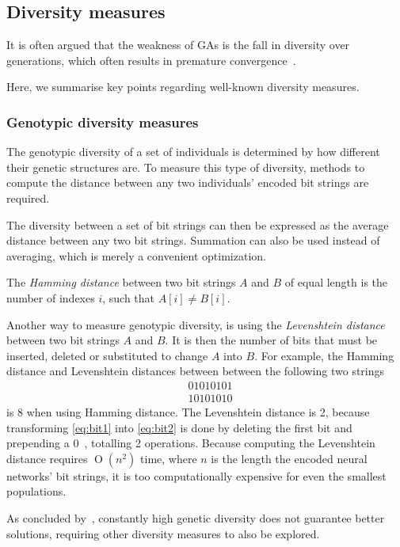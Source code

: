 \subsection{Diversity measures}
It is often argued that the weakness of GAs is the fall in diversity over generations, which often results in premature convergence~\cite{diaz2007empirical, 1266373,Zitzler00comparisonof}.

Here, we summarise key points regarding well-known diversity measures. %

\subsubsection{Genotypic diversity measures}
The genotypic diversity of a set of individuals is determined by how different their genetic structures are. To measure this type of diversity, methods to compute the distance between any two individuals' encoded bit strings are required.

The diversity between a set of bit strings can then be expressed as the average distance between any two bit strings. Summation can also be used instead of averaging, which is merely a convenient optimization.

The \emph{Hamming distance} between two bit strings $A$ and $B$ of equal length is the number of indexes $i$, such that $A[i] \neq B[i]$.

Another way to measure genotypic diversity, is using the \emph{Levenshtein distance} between two bit strings $A$ and $B$. It is then the number of bits that must be inserted, deleted or substituted to change $A$ into $B$. For example, the Hamming distance and Levenshtein distances between between the following two strings
%
\begin{align}
&01010101\label{eq:bit1} \\
&10101010\label{eq:bit2}
\end{align}
%
is 8 when using Hamming distance. The Levenshtein distance is 2, because transforming \cref{eq:bit1} into \cref{eq:bit2} is done by deleting the first bit and prepending a $0$~\cite{1250187}, totalling 2 operations. Because computing the Levenshtein distance requires $\operatorname{O}\left(n^2\right)$ time, where $n$ is the length the encoded neural networks' bit strings, it is too computationally expensive for even the smallest populations.

As concluded by~\cite{Darwen00doesextra}, constantly high genetic diversity does not guarantee better solutions, requiring other diversity measures to also be explored.

